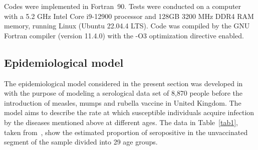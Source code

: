 \documentclass[11pt]{article}
\begin{document}
Codes were implemented in Fortran~90. Tests were conducted on a computer with a 5.2 GHz Intel Core i9-12900 processor and 128GB 3200 MHz DDR4 RAM memory, running Linux (Ubuntu 22.04.4 LTS). Code was compiled by the GNU Fortran compiler (version 11.4.0) with the -O3 optimization directive enabled.

\subsection{Epidemiological model} \label{numexp1}

The epidemiological model considered in the present section was developed in~\cite{farrington} with the purpose of modeling a serological data set of 8{,}870 people before the introduction of measles, mumps and rubella vaccine in United Kingdom. The model aims to describe the rate at which susceptible individuals acquire infection by the diseases mentioned above at different ages. The data in Table~\ref{tab1}, taken from~\cite{farrington}, show the estimated proportion of seropositive in the unvaccinated segment of the sample divided into 29 age groups.
\end{document}
